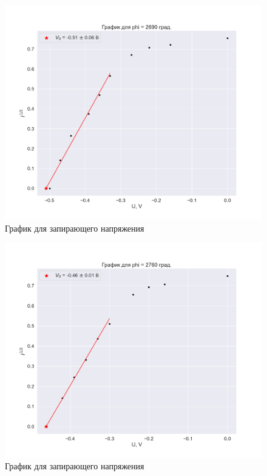 \documentclass[a4paper, 12pt]{article}
\begin{document}
\begin{figure}[H]
    \centering
    \includegraphics[width=1\textwidth]{plot_zero8.png}
    \caption{График для запирающего напряжения}
\end{figure}

\begin{figure}[H]
    \centering
    \includegraphics[width=1\textwidth]{plot_zero9.png}
    \caption{График для запирающего напряжения}
\end{figure}
\end{document}
